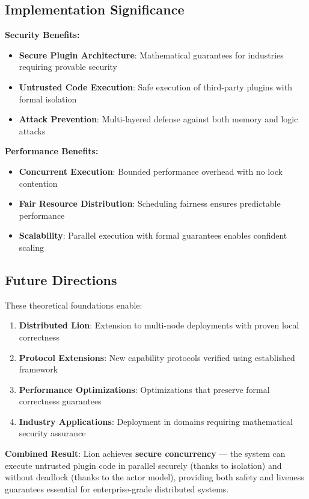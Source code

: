 \subsection{Implementation Significance}

\textbf{Security Benefits:}
\begin{itemize}
\item \textbf{Secure Plugin Architecture}: Mathematical guarantees for industries requiring provable security
\item \textbf{Untrusted Code Execution}: Safe execution of third-party plugins with formal isolation
\item \textbf{Attack Prevention}: Multi-layered defense against both memory and logic attacks
\end{itemize}

\textbf{Performance Benefits:}
\begin{itemize}
\item \textbf{Concurrent Execution}: Bounded performance overhead with no lock contention
\item \textbf{Fair Resource Distribution}: Scheduling fairness ensures predictable performance
\item \textbf{Scalability}: Parallel execution with formal guarantees enables confident scaling
\end{itemize}

\subsection{Future Directions}

These theoretical foundations enable:

\begin{enumerate}
\item \textbf{Distributed Lion}: Extension to multi-node deployments with proven local correctness
\item \textbf{Protocol Extensions}: New capability protocols verified using established framework
\item \textbf{Performance Optimizations}: Optimizations that preserve formal correctness guarantees
\item \textbf{Industry Applications}: Deployment in domains requiring mathematical security assurance
\end{enumerate}

\textbf{Combined Result}: Lion achieves \textbf{secure concurrency} — the system can execute untrusted plugin code in parallel securely (thanks to isolation) and without deadlock (thanks to the actor model), providing both safety and liveness guarantees essential for enterprise-grade distributed systems.

\newpage

